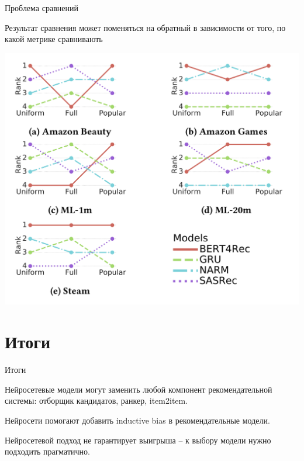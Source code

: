 \documentclass[11pt,aspectratio=169]{beamer}
\begin{document}
\begin{frame}{Проблема сравнений \cite{DALMANN}}

\begin{tcolorbox}[colback=warn!5,colframe=warn!80,title=]
Результат сравнения может поменяться на обратный в зависимости от того, по какой метрике сравнивають
\end{tcolorbox}

\begin{center}
\includegraphics[scale=0.25]{images/compare.png}
\end{center}

\end{frame}

\section{Итоги}

\begin{frame}{Итоги}

\begin{tcolorbox}[colback=info!5,colframe=info!80,title=]
Нейросетевые модели могут заменить любой компонент рекомендательной системы: отборщик кандидатов, ранкер, item2item.
\end{tcolorbox}

\begin{tcolorbox}[colback=info!5,colframe=info!80,title=]
Нейросети помогают добавить inductive bias в рекомендательные модели.
\end{tcolorbox}

\begin{tcolorbox}[colback=warn!5,colframe=warn!80,title=]
Нейросетевой подход не гарантирует выигрыша -- к выбору модели нужно подходить прагматично.
\end{tcolorbox}

\end{frame}
\end{document}
